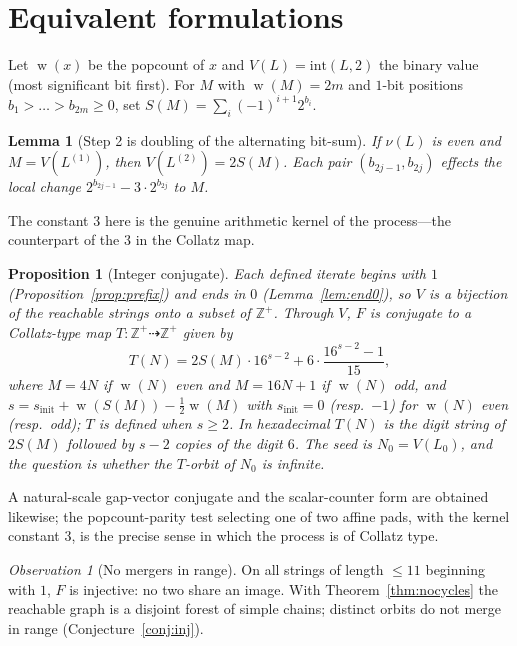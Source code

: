 \documentclass[11pt,reqno]{amsart}
\theoremstyle{plain}
\newtheorem{proposition}{Proposition}
\newtheorem{lemma}{Lemma}
\theoremstyle{definition}
\theoremstyle{remark}
\newtheorem{observation}{Observation}
\DeclareMathOperator{\popcount}{w}
\begin{document}
\section{Equivalent formulations}\label{sec:equiv}
Let $\popcount(x)$ be the popcount of $x$ and $V(L)=\mathrm{int}(L,2)$ the binary value (most significant bit first). For $M$ with $\popcount(M)=2m$ and $1$-bit positions $b_1>\dots>b_{2m}\ge 0$, set $S(M)=\sum_i(-1)^{i+1}2^{b_i}$.

\begin{lemma}[Step 2 is doubling of the alternating bit-sum]\label{lem:S}
If $\nu(L)$ is even and $M=V(L^{(1)})$, then $V(L^{(2)})=2S(M)$. Each pair $(b_{2j-1},b_{2j})$ effects the local change $2^{b_{2j-1}}-3\cdot 2^{b_{2j}}$ to $M$.
\end{lemma}

The constant $3$ here is the genuine arithmetic kernel of the process---the counterpart of the $3$ in the Collatz map.

\begin{proposition}[Integer conjugate]\label{prop:T}
Each defined iterate begins with $1$ (Proposition~\ref{prop:prefix}) and ends in $0$ (Lemma~\ref{lem:end0}), so $V$ is a bijection of the reachable strings onto a subset of $\mathbb Z^+$. Through $V$, $F$ is conjugate to a Collatz-type map $T:\mathbb Z^+\dashrightarrow\mathbb Z^+$ given by
\[ T(N)=2S(M)\cdot 16^{s-2}+6\cdot\frac{16^{s-2}-1}{15}, \]
where $M=4N$ if $\popcount(N)$ even and $M=16N+1$ if $\popcount(N)$ odd, and $s=s_{\mathrm{init}}+\popcount(S(M))-\tfrac12\popcount(M)$ with $s_{\mathrm{init}}=0$ (resp.\ $-1$) for $\popcount(N)$ even (resp.\ odd); $T$ is defined when $s\ge 2$. In hexadecimal $T(N)$ is the digit string of $2S(M)$ followed by $s-2$ copies of the digit $6$. The seed is $N_0=V(L_0)$, and the question is whether the $T$-orbit of $N_0$ is infinite.
\end{proposition}

A natural-scale gap-vector conjugate and the scalar-counter form are obtained likewise; the popcount-parity test selecting one of two affine pads, with the kernel constant $3$, is the precise sense in which the process is of Collatz type.

\begin{observation}[No mergers in range]\label{obs:inj}
On all strings of length $\le 11$ beginning with $1$, $F$ is injective: no two share an image. With Theorem~\ref{thm:nocycles} the reachable graph is a disjoint forest of simple chains; distinct orbits do not merge in range (Conjecture~\ref{conj:inj}).
\end{observation}
\end{document}
